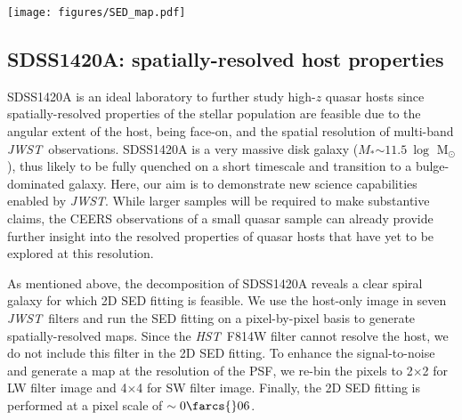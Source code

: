 \documentclass[twocolumn]{aastex631}
\newcommand{\smass}{{$M_*$}}
\newcommand{\hst}{{\it HST}}
\newcommand{\jwst}{{\it JWST}}
\begin{document}
\begin{figure*}
\centering
\texttt{[image: figures/SED\_map.pdf]}
\caption{Spatially-resolved host properties of SDSS1420A. The panels from left to right are as follows: (1) the original quasar color image from combining three \jwst\ filters as indicated, (2) the color image of the host galaxy after the central quasar is subtracted in each filter, (3) the stellar mass map. (4) SFR map, and (5) age map. In various panels, three regions are indicated with a radius of 2~kpc, 4~kpc, and 8~kpc. The 2~kpc region is applied as a mask in (3)-(5) panels.}
\label{fig:sedmap}
\end{figure*}

\subsection{SDSS1420A: spatially-resolved host properties}

SDSS1420A is an ideal laboratory to further study high-$z$ quasar hosts since spatially-resolved properties of the stellar population are feasible due to the angular extent of the host, being face-on, and the spatial resolution of multi-band \jwst\ observations. SDSS1420A is a very massive disk galaxy (\smass$\sim11.5~\log$ M$_{\odot}$), thus likely to be fully quenched on a short timescale and transition to a bulge-dominated galaxy. Here, our aim is to demonstrate new science capabilities enabled by \jwst. While larger samples will be required to make substantive claims, the CEERS observations of a small quasar sample can already provide further insight into the resolved properties of quasar hosts that have yet to be explored at this resolution.

As mentioned above, the decomposition of SDSS1420A reveals a clear spiral galaxy for which 2D SED fitting is feasible. We use the host-only image in seven \jwst\ filters and run the SED fitting on a pixel-by-pixel basis to generate spatially-resolved maps. Since the \hst\ F814W filter cannot resolve the host, we do not include this filter in the 2D SED fitting. To enhance the signal-to-noise and generate a map at the resolution of the PSF, we re-bin the pixels to 2$\times$2 for LW filter image and 4$\times$4 for SW filter image. Finally, the 2D SED fitting is performed at a pixel scale of $\sim0\farcs{}06$.
\end{document}

